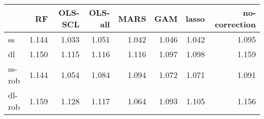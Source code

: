 \begin{tabular}{lrrrrrrr}
\toprule
 & RF & OLS-SCL & OLS-all & MARS & GAM & lasso & no-correction \\
\midrule
ss & {\cellcolor[HTML]{000000}} \color[HTML]{F1F1F1} 1.144 & {\cellcolor[HTML]{F1F1F1}} \color[HTML]{000000} 1.033 & {\cellcolor[HTML]{CACACA}} \color[HTML]{000000} 1.051 & {\cellcolor[HTML]{DDDDDD}} \color[HTML]{000000} 1.042 & {\cellcolor[HTML]{D4D4D4}} \color[HTML]{000000} 1.046 & {\cellcolor[HTML]{DDDDDD}} \color[HTML]{000000} 1.042 & {\cellcolor[HTML]{6A6A6A}} \color[HTML]{F1F1F1} 1.095 \\
dl & {\cellcolor[HTML]{222222}} \color[HTML]{F1F1F1} 1.150 & {\cellcolor[HTML]{ADADAD}} \color[HTML]{000000} 1.115 & {\cellcolor[HTML]{A7A7A7}} \color[HTML]{F1F1F1} 1.116 & {\cellcolor[HTML]{A7A7A7}} \color[HTML]{F1F1F1} 1.116 & {\cellcolor[HTML]{F1F1F1}} \color[HTML]{000000} 1.097 & {\cellcolor[HTML]{EDEDED}} \color[HTML]{000000} 1.098 & {\cellcolor[HTML]{000000}} \color[HTML]{F1F1F1} 1.159 \\
ss-rob & {\cellcolor[HTML]{000000}} \color[HTML]{F1F1F1} 1.144 & {\cellcolor[HTML]{F1F1F1}} \color[HTML]{000000} 1.054 & {\cellcolor[HTML]{A2A2A2}} \color[HTML]{F1F1F1} 1.084 & {\cellcolor[HTML]{878787}} \color[HTML]{F1F1F1} 1.094 & {\cellcolor[HTML]{C3C3C3}} \color[HTML]{000000} 1.072 & {\cellcolor[HTML]{C5C5C5}} \color[HTML]{000000} 1.071 & {\cellcolor[HTML]{8F8F8F}} \color[HTML]{F1F1F1} 1.091 \\
dl-rob & {\cellcolor[HTML]{000000}} \color[HTML]{F1F1F1} 1.159 & {\cellcolor[HTML]{4E4E4E}} \color[HTML]{F1F1F1} 1.128 & {\cellcolor[HTML]{696969}} \color[HTML]{F1F1F1} 1.117 & {\cellcolor[HTML]{F1F1F1}} \color[HTML]{000000} 1.064 & {\cellcolor[HTML]{A8A8A8}} \color[HTML]{F1F1F1} 1.093 & {\cellcolor[HTML]{888888}} \color[HTML]{F1F1F1} 1.105 & {\cellcolor[HTML]{060606}} \color[HTML]{F1F1F1} 1.156 \\
\bottomrule
\end{tabular}

